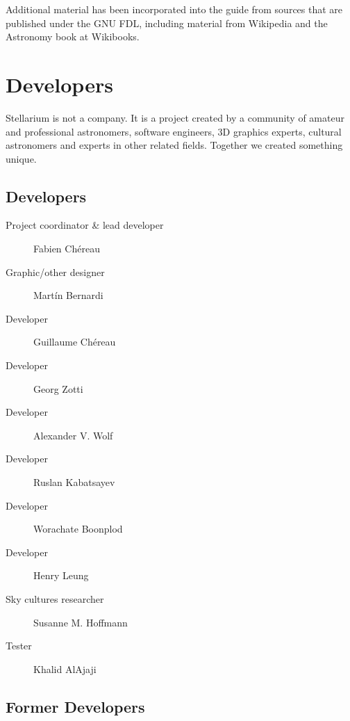 Additional material has been incorporated into the guide from sources
that are published under the GNU FDL, including material from Wikipedia
and the Astronomy book at Wikibooks.

\section{Developers}
\label{sec:Developers}

Stellarium is not a company. It is a project created by a community of
amateur and professional astronomers, software engineers, 3D graphics
experts, cultural astronomers and experts in other related
fields. Together we created something unique.


\subsection{Developers}
\begin{description}
\item[Project coordinator \& lead developer] Fabien Chéreau
\item[Graphic/other designer] Martín Bernardi
\item[Developer] Guillaume Chéreau
\item[Developer] Georg Zotti
\item[Developer] Alexander V. Wolf
\item[Developer] Ruslan Kabatsayev
\item[Developer] Worachate Boonplod
\item[Developer] Henry Leung
\item[Sky cultures researcher] Susanne M. Hoffmann
\item[Tester] Khalid AlAjaji
\end{description}

\subsection{Former Developers}

